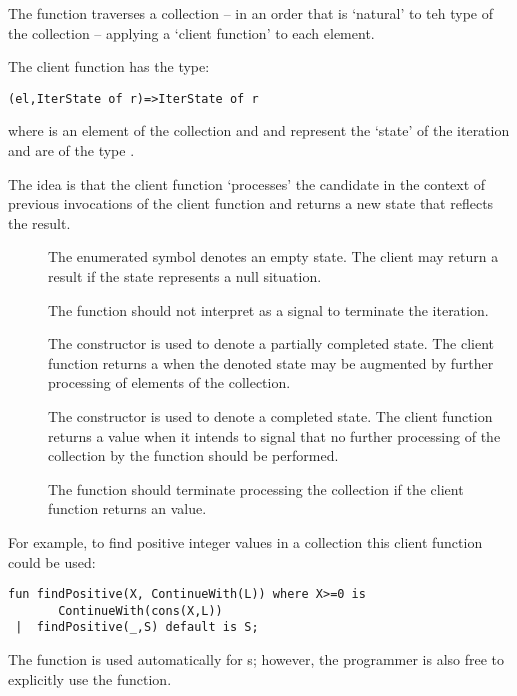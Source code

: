 The  function traverses a collection -- in an order that is `natural' to teh type of the collection -- applying a `client function' to each element.

The client function has the type:
\begin{lstlisting}
(el,IterState of r)=>IterState of r
\end{lstlisting}
where  is an element of the collection and  and  represent the `state' of the iteration and are of the type .

\begin{aside}
The idea is that the client function `processes' the candidate in the context of previous invocations of the client function and returns a new state that reflects the result.
\end{aside}

\begin{description}
\item[] The  enumerated symbol denotes an empty state. The client may return a  result if the state represents a null situation.

\begin{aside}
The  function should not interpret  as a signal to terminate the iteration.
\end{aside}
\item[]
The  constructor is used to denote a partially completed state. The client function returns a  when the denoted state may be augmented by further processing of elements of the collection.
\item[]
The  constructor is used to denote a completed state. The client function returns a  value when it intends to signal that no further processing of the collection by the  function should be performed.

The  function should terminate processing the collection if the client function returns an  value.
\end{description}

For example, to find positive integer values in a collection this client function could be used:
\begin{lstlisting}
fun findPositive(X, ContinueWith(L)) where X>=0 is
       ContinueWith(cons(X,L))
 |  findPositive(_,S) default is S;
\end{lstlisting}
\begin{aside}
The  function is used automatically for s; however, the programmer is also free to explicitly use the  function.
\end{aside}
 
